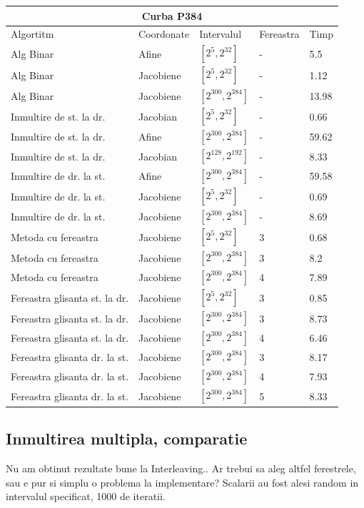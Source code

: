 \begin{tabular}{ |p{5cm}||p{3cm}|p{3cm}|p{2cm}|p{1cm}|  }
 \hline
 \multicolumn{5}{|c|}{Curba P384} \\
 \hline
 Algortitm& Coordonate &Intervalul &Fereastra &Timp\\
 \hline
 Alg Binar & Afine  &$[2^{5},2^{32}]$& - & 5.5\\
 Alg Binar&Jacobiene  & $[2^{5},2^{32}]$ & - & 1.12\\
 Alg Binar&Jacobiene  & $[2^{300},2^{384}]$ & - & 13.98\\
 Inmultire de st. la dr. & Jacobian & $[2^{5},2^{32}]$& - & 0.66\\
 Inmultire de st. la dr. & Afine & $[2^{300},2^{384}]$& - & 59.62\\
 Inmultire de st. la dr. & Jacobian & $[2^{128},2^{192}]$& - & 8.33\\
 Inmultire de dr. la st. &Afine & $[2^{300},2^{384}]$ & - & 59.58\\
 Inmultire de dr. la st. &Jacobiene & $[2^{5},2^{32}]$ & - & 0.69\\
 Inmultire de dr. la st. &Jacobiene & $[2^{300},2^{384}]$ & - & 8.69\\
 Metoda cu fereastra& Jacobiene & $[2^{5},2^{32}]$ & 3 & 0.68\\
 Metoda cu fereastra& Jacobiene & $[2^{300},2^{384}]$ & 3 & 8.2\\
 Metoda cu fereastra& Jacobiene & $[2^{300},2^{384}]$ & 4 & 7.89\\
 Fereastra glisanta st. la dr.& Jacobiene  & $[2^{5},2^{32}]$& 3 & 0.85\\
 Fereastra glisanta st. la dr.& Jacobiene  & $[2^{300},2^{384}]$& 3 & 8.73\\
  Fereastra glisanta st. la dr.& Jacobiene  & $[2^{300},2^{384}]$& 4 & 6.46\\
 Fereastra glisanta dr. la st.& Jacobiene  & $[2^{300},2^{384}]$& 3 & 8.17\\
 Fereastra glisanta dr. la st.& Jacobiene  & $[2^{300},2^{384}]$& 4 & 7.93\\
 Fereastra glisanta dr. la st.& Jacobiene  & $[2^{300},2^{384}]$& 5 & 8.33\\
 \hline
\end{tabular}	

\subsection{Inmultirea multipla, comparatie}
\label{subsec:subsec04}
Nu am obtinut rezultate bune la Interleaving.. Ar trebui sa aleg altfel ferestrele, sau e pur si simplu o problema la implementare? Scalarii au fost alesi random in intervalul specificat, 1000 de iteratii.

